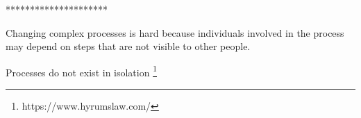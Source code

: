 *********************

Changing complex processes is hard because individuals involved in the process may depend on steps that are not visible to other people.


Processes do not exist in isolation
\footnote{https://www.hyrumslaw.com/} %
